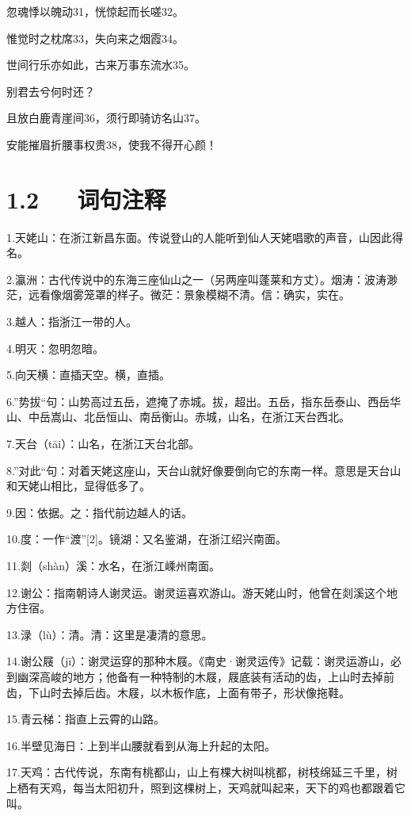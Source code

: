 \documentclass[letterpaper,10pt,english]{sphinxmanual}
\begin{document}
忽魂悸以魄动31，恍惊起而长嗟32。

惟觉时之枕席33，失向来之烟霞34。

世间行乐亦如此，古来万事东流水35。

别君去兮何时还？

且放白鹿青崖间36，须行即骑访名山37。

安能摧眉折腰事权贵38，使我不得开心颜！


\section{1.2   词句注释}
\label{\detokenize{p01_u6563_u6587/_u674e_u767d-_u68a6_u6e38_u5929_u59e5_u541f_u7559_u522b:id4}}
1.天姥山：在浙江新昌东面。传说登山的人能听到仙人天姥唱歌的声音，山因此得名。

2.瀛洲：古代传说中的东海三座仙山之一（另两座叫蓬莱和方丈）。烟涛：波涛渺茫，远看像烟雾笼罩的样子。微茫：景象模糊不清。信：确实，实在。

3.越人：指浙江一带的人。

4.明灭：忽明忽暗。

5.向天横：直插天空。横，直插。

6.”势拔“句：山势高过五岳，遮掩了赤城。拔，超出。五岳，指东岳泰山、西岳华山、中岳嵩山、北岳恒山、南岳衡山。赤城，山名，在浙江天台西北。

7.天台（tāi）：山名，在浙江天台北部。

8.”对此“句：对着天姥这座山，天台山就好像要倒向它的东南一样。意思是天台山和天姥山相比，显得低多了。

9.因：依据。之：指代前边越人的话。

10.度：一作“渡”{[}2{]}。镜湖：又名鉴湖，在浙江绍兴南面。

11.剡（shàn）溪：水名，在浙江嵊州南面。

12.谢公：指南朝诗人谢灵运。谢灵运喜欢游山。游天姥山时，他曾在剡溪这个地方住宿。

13.渌（lù）：清。清：这里是凄清的意思。

14.谢公屐（jī）：谢灵运穿的那种木屐。《南史·谢灵运传》记载：谢灵运游山，必到幽深高峻的地方；他备有一种特制的木屐，屐底装有活动的齿，上山时去掉前齿，下山时去掉后齿。木屐，以木板作底，上面有带子，形状像拖鞋。

15.青云梯：指直上云霄的山路。

16.半壁见海日：上到半山腰就看到从海上升起的太阳。

17.天鸡：古代传说，东南有桃都山，山上有棵大树叫桃都，树枝绵延三千里，树上栖有天鸡，每当太阳初升，照到这棵树上，天鸡就叫起来，天下的鸡也都跟着它叫。
\end{document}
